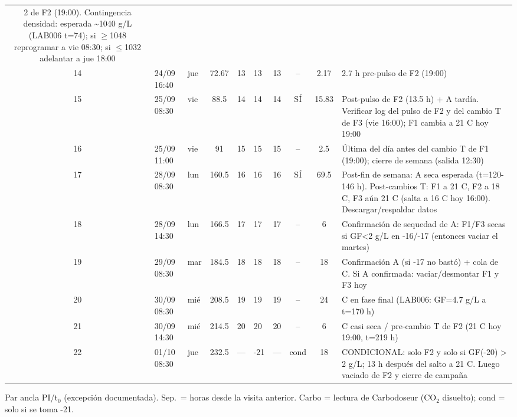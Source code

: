\documentclass[10pt,landscape]{article}
\begin{document}
{\begin{longtable}{c L{2.2cm} L{1.6cm} c L{1.9cm} L{1.9cm} L{1.9cm} c c L{5.8cm}}
2 de F2 (19:00). Contingencia densidad: esperada \textasciitilde{}1040 g/L (LAB006 t=74); si $\geq$1048 reprogramar a vie 08:30; si $\leq$1032 adelantar a jue 18:00 \\14 & 24/09 16:40 & jue & 72.67 & 13 & 13 & 13 & -- & 2.17 & 2.7 h pre-pulso de F2 (19:00) \\15 & 25/09 08:30 & vie & 88.5 & 14 & 14 & 14 & SÍ & 15.83 & Post-pulso de F2 (13.5 h) + A tardía. Verificar log del pulso de F2 y del cambio T de F3 (vie 16:00); F1 cambia a 21 \textdegree{}C hoy 19:00 \\16 & 25/09 11:00 & vie & 91 & 15 & 15 & 15 & -- & 2.5 & Última del día antes del cambio T de F1 (19:00); cierre de semana (salida 12:30) \\17 & 28/09 08:30 & lun & 160.5 & 16 & 16 & 16 & SÍ & 69.5 & Post-fin de semana: A seca esperada (t=120-146 h). Post-cambios T: F1 a 21 \textdegree{}C, F2 a 18 \textdegree{}C, F3 aún 21 \textdegree{}C (salta a 16 \textdegree{}C hoy 16:00). Descargar/respaldar datos \\18 & 28/09 14:30 & lun & 166.5 & 17 & 17 & 17 & -- & 6 & Confirmación de sequedad de A: F1/F3 secas si GF<2 g/L en -16/-17 (entonces vaciar el martes) \\19 & 29/09 08:30 & mar & 184.5 & 18 & 18 & 18 & -- & 18 & Confirmación A (si -17 no bastó) + cola de C. Si A confirmada: vaciar/desmontar F1 y F3 hoy \\20 & 30/09 08:30 & mié & 208.5 & 19 & 19 & 19 & -- & 24 & C en fase final (LAB006: GF=4.7 g/L a t=170 h) \\21 & 30/09 14:30 & mié & 214.5 & 20 & 20 & 20 & -- & 6 & C casi seca / pre-cambio T de F2 (21 \textdegree{}C hoy 19:00, t=219 h) \\22 & 01/10 08:30 & jue & 232.5 & --- & -21 & --- & cond & 18 & CONDICIONAL: solo F2 y solo si GF(-20) > 2 g/L; 13 h después del salto a 21 \textdegree{}C. Luego vaciado de F2 y cierre de campaña \\
\bottomrule
\end{longtable}
}
\footnotesize *Par ancla PI/t$_0$ (excepción documentada). Sep.\ = horas desde la visita anterior. Carbo = lectura de Carbodoseur (CO$_2$ disuelto); cond = solo si se toma -21.
\end{document}
